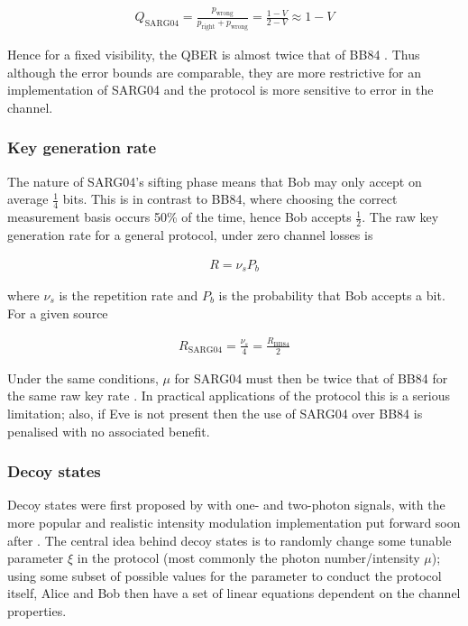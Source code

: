 \documentclass[paper=a4, fontsize=11pt]{scrartcl} %
\numberwithin{equation}{section} %
\numberwithin{figure}{section} %
\numberwithin{table}{section} %
\begin{document}
\begin{align}
	Q_{\mathrm{SARG04}} =
	\frac{p_{\mathrm{wrong}}}{p_{\mathrm{right}} + p_{\mathrm{wrong}}}
	= \frac{1-V}{2-V}
	\approx 1-V
\end{align}

Hence for a fixed visibility, the QBER is almost twice that of BB84 \citep{branciardSARG04}. Thus although the error bounds
are comparable, they are more restrictive for an implementation of SARG04 and the protocol is more sensitive to error in the channel.

\subsubsection{Key generation rate}
The nature of SARG04's sifting phase means that Bob may only accept on average $\frac{1}{4}$ bits. This is in contrast to BB84, where
choosing the correct measurement basis occurs 50\% of the time, hence Bob accepts $\frac{1}{2}$. The raw key generation rate for a general protocol,
under zero channel losses is

\begin{align}
R = \nu_s P_b
\end{align}

where $\nu_s$ is the repetition rate and $P_b$ is the probability that Bob accepts a bit. For a given source

\begin{align}
	R_{\mathrm{SARG04}} = \frac{\nu_s}{4} = \frac{R_{\mathrm{BB84}}}{2}
\end{align}

Under the same conditions, $\mu$ for SARG04 must then be twice that of BB84 for the same raw key rate \citep{perf2protocols, SARG04orig}.
In practical applications of the protocol this is a serious limitation; also, if Eve is not present then the use of SARG04 over BB84 is penalised
with no associated benefit.

\subsubsection{Decoy states}
Decoy states were first proposed by \citet{decoyOrig} with one- and two-photon signals, with the more popular and realistic
intensity modulation implementation put forward soon after \citep{lo2005}. The central idea behind decoy states is to randomly
change some tunable parameter $\xi$ in the protocol (most commonly the photon number/intensity $\mu$); using some subset
of possible values for the parameter to conduct the protocol itself, Alice and Bob then have a set of linear equations dependent
on the channel properties.
\end{document}
